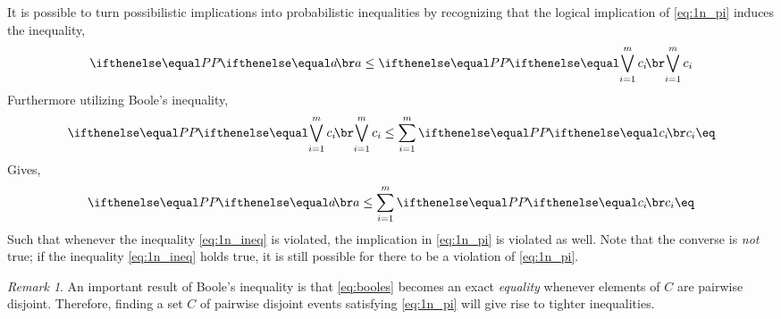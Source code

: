 \documentclass[aps, 10pt, english, twoside, pra, nofootinbib, longbibliography]{revtex4-1}
\theoremstyle{plain}
\theoremstyle{definition}
\theoremstyle{remark}
\newtheorem{remark}[theorem]{Remark}
\begin{document}
    It is possible to turn possibilistic implications into probabilistic inequalities by recognizing that the logical implication of \cref{eq:1n_pi} induces the inequality,
    \[ \prob[][a] \leq \prob[][\bigvee_{i=1}^{m} c_i] \]
    Furthermore utilizing Boole's inequality,
    \[ \prob[][\bigvee_{i=1}^{m} c_i] \leq \sum_{i=1}^{m} \prob[][c_i] \eq \label{eq:booles} \]
    Gives,
    \[ \prob[][a] \leq \sum_{i=1}^{m} \prob[][c_i] \eq \label{eq:1n_ineq} \]
    Such that whenever the inequality \cref{eq:1n_ineq} is violated, the implication in \cref{eq:1n_pi} is violated as well. Note that the converse is \textit{not} true; if the inequality \cref{eq:1n_ineq} holds true, it is still possible for there to be a violation of \cref{eq:1n_pi}.

    \begin{remark}
        An important result of Boole's inequality is that \cref{eq:booles} becomes an exact \textit{equality} whenever elements of $C$ are pairwise disjoint. Therefore, finding a set $C$ of pairwise disjoint events satisfying \cref{eq:1n_pi} will give rise to tighter inequalities.
    \end{remark}
\end{document}
